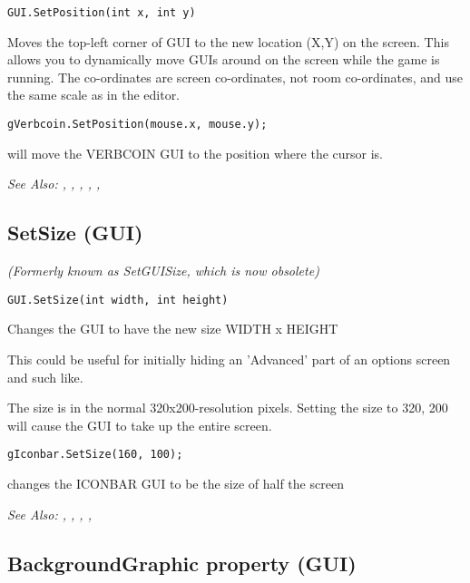 \begin{verbatim}
GUI.SetPosition(int x, int y)
\end{verbatim}
Moves the top-left corner of GUI to the new location (X,Y) on the screen.
This allows you to dynamically move GUIs around on the screen while the
game is running. The co-ordinates are screen co-ordinates, not room
co-ordinates, and use the same scale as in the editor.

\begin{verbatim}
gVerbcoin.SetPosition(mouse.x, mouse.y);
\end{verbatim}
will move the VERBCOIN GUI to the position where the cursor is.

\it{See Also:} , ,
, ,
, 



\subsection{SetSize (GUI)}\label{GUI.SetSize}%

\it{(Formerly known as SetGUISize, which is now obsolete)}

\begin{verbatim}
GUI.SetSize(int width, int height)
\end{verbatim}
Changes the GUI to have the new size  WIDTH x HEIGHT

This could be useful for initially hiding an 'Advanced' part of an options screen
and such like.

The size is in the normal 320x200-resolution pixels. Setting the size to 320, 200 will
cause the GUI to take up the entire screen.

\begin{verbatim}
gIconbar.SetSize(160, 100);
\end{verbatim}
changes the ICONBAR GUI to be the size of half the screen

\it{See Also:} ,
,
,
,



\subsection{BackgroundGraphic property (GUI)}\label{GUI.BackgroundGraphic}%

